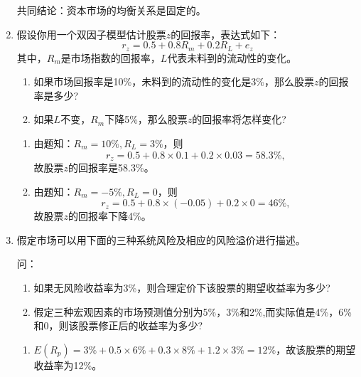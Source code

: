 \begin{enumerate}
\begin{enumerate}[label=(\arabic*)]
    \end{enumerate}
    共同结论：资本市场的均衡关系是固定的。
    \item 假设你用一个双因子模型估计股票$z$的回报率，表达式如下：
    \[r_z=0.5+0.8R_m+0.2R_L+e_z\]其中，$R_m$是市场指数的回报率，$L$代表未料到的流动性的变化。
    \begin{enumerate}[label=(\arabic*)]
        \item 如果市场回报率是10\%，未料到的流动性的变化是3\%，那么股票$z$的回报率是多少?
        \item 如果$L$不变，$R_m$下降5\%，那么股票$z$的回报率将怎样变化?
    \end{enumerate}
    \sol
    \begin{enumerate}[label=(\arabic*)]
        \item 由题知：$R_m = 10\%, R_L = 3\%$，则
        \[r_z=0.5 + 0.8 \times 0.1 + 0.2 \times 0.03 = 58.3\%,\]
        故股票$z$的回报率是58.3\%。
        \item 由题知：$R_m = -5\%, R_L = 0$，则
        \[r_z=0.5 + 0.8 \times (-0.05) + 0.2 \times 0 = 46\%,\]
        故股票$z$的回报率下降4\%。
    \end{enumerate}
    \item 假定市场可以用下面的三种系统风险及相应的风险溢价进行描述。
    \begin{center}
    \end{center}
    问：\begin{enumerate}[label=(\arabic*)]
        \item 如果无风险收益率为3\%，则合理定价下该股票的期望收益率为多少?
        \item 假定三种宏观因素的市场预测值分别为5\%，3\%和2\%,而实际值是4\%，6\%和0，则该股票修正后的收益率为多少?
    \end{enumerate}
    \sol
    \begin{enumerate}[label=(\arabic*)]
        \item $E(R_p) = 3\% + 0.5 \times 6\% + 0.3 \times 8\% + 1.2 \times 3\% = 12\%$，故该股票的期望收益率为12\%。

\end{enumerate}
\end{enumerate}
